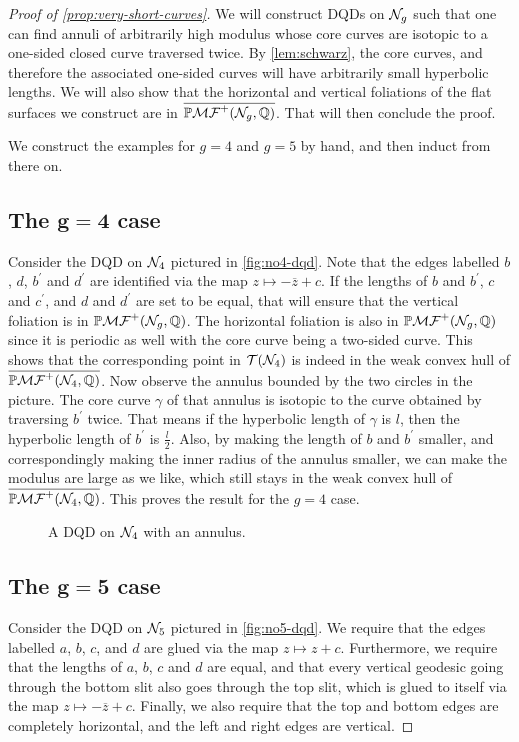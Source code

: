 \documentclass[12pt, reqno]{amsart}
\begin{document}
\begin{proof}[Proof of \autoref{prop:very-short-curves}]
  We will construct DQDs on $\mathcal{N}_g$ such that one can find annuli of arbitrarily high modulus whose core curves are isotopic to a one-sided closed curve traversed twice.
  By \autoref{lem:schwarz}, the core curves, and therefore the associated one-sided curves will have arbitrarily small hyperbolic lengths.
  We will also show that the horizontal and vertical foliations of the flat surfaces we
  construct are in $\overline{\mathbb{P}\mathcal{MF}^+(\mathcal{N}_g, \mathbb{Q})}$.
  That will then conclude the proof.

  We construct the examples for $g=4$ and $g=5$ by hand, and then induct from there on.

\subsection*{The $\mathbf{g=4}$ case}
Consider the DQD on $\mathcal{N}_4$ pictured in \autoref{fig:no4-dqd}.
Note that the edges labelled $b$, $d$, $b^{\prime}$ and $d^{\prime}$ are identified via the map $z \mapsto -\overline{z} + c$.
If the lengths of $b$ and $b^{\prime}$, $c$ and $c^{\prime}$, and $d$ and $d^{\prime}$ are set to be equal, that will ensure that the vertical foliation is in $\mathbb{P}\mathcal{MF}^+(\mathcal{N}_g, \mathbb{Q})$.
The horizontal foliation is also in $\mathbb{P}\mathcal{MF}^+(\mathcal{N}_g, \mathbb{Q})$ since it is periodic as well with the core curve being a two-sided curve.
This shows that the corresponding point in $\mathcal{T}(\mathcal{N}_4)$ is indeed in the weak convex hull of $\overline{\mathbb{P}\mathcal{MF}^+(\mathcal{N}_4, \mathbb{Q})}$.
Now observe the annulus bounded by the two circles in the picture.
The core curve $\gamma$ of that annulus is isotopic to the curve obtained by traversing $b^{\prime}$ twice.
That means if the hyperbolic length of $\gamma$ is $l$, then the hyperbolic length of $b^{\prime}$ is $\frac{l}{2}$.
Also, by making the length of $b$ and $b^{\prime}$ smaller, and correspondingly making the inner radius of the annulus smaller, we can make the modulus are large as we like, which still stays in the weak convex hull of $\overline{\mathbb{P}\mathcal{MF}^+(\mathcal{N}_4, \mathbb{Q})}$.
This proves the result for the $g=4$ case.
\begin{figure}[h]
  \centering
  \caption{A DQD on $\mathcal{N}_4$ with an annulus.}
  \label{fig:no4-dqd}
\end{figure}

\subsection*{The $\mathbf{g=5}$ case}
Consider the DQD on $\mathcal{N}_5$ pictured in \autoref{fig:no5-dqd}.
We require that the edges labelled $a$, $b$, $c$, and $d$ are glued via the map $z \mapsto z + c$.
Furthermore, we require that the lengths of $a$, $b$, $c$ and $d$ are equal, and that every vertical geodesic going through the bottom slit also goes through the top slit, which is glued to itself via the map $z \mapsto -\overline{z} + c$.
Finally, we also require that the top and bottom edges are completely horizontal, and the left and right edges are vertical.


\end{proof}
\end{document}
